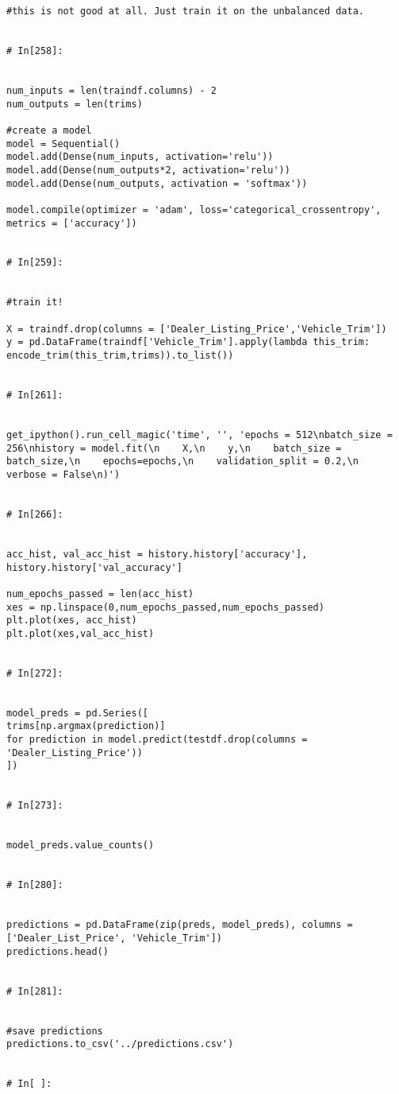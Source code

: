 \begin{verbatim}
#this is not good at all. Just train it on the unbalanced data.


# In[258]:


num_inputs = len(traindf.columns) - 2
num_outputs = len(trims)

#create a model
model = Sequential()
model.add(Dense(num_inputs, activation='relu'))
model.add(Dense(num_outputs*2, activation='relu'))
model.add(Dense(num_outputs, activation = 'softmax'))

model.compile(optimizer = 'adam', loss='categorical_crossentropy', metrics = ['accuracy'])


# In[259]:


#train it!

X = traindf.drop(columns = ['Dealer_Listing_Price','Vehicle_Trim'])
y = pd.DataFrame(traindf['Vehicle_Trim'].apply(lambda this_trim: encode_trim(this_trim,trims)).to_list())


# In[261]:


get_ipython().run_cell_magic('time', '', 'epochs = 512\nbatch_size = 256\nhistory = model.fit(\n    X,\n    y,\n    batch_size = batch_size,\n    epochs=epochs,\n    validation_split = 0.2,\n    verbose = False\n)')


# In[266]:


acc_hist, val_acc_hist = history.history['accuracy'], history.history['val_accuracy']

num_epochs_passed = len(acc_hist)
xes = np.linspace(0,num_epochs_passed,num_epochs_passed)
plt.plot(xes, acc_hist)
plt.plot(xes,val_acc_hist)


# In[272]:


model_preds = pd.Series([
trims[np.argmax(prediction)]
for prediction in model.predict(testdf.drop(columns = 'Dealer_Listing_Price'))
])


# In[273]:


model_preds.value_counts()


# In[280]:


predictions = pd.DataFrame(zip(preds, model_preds), columns = ['Dealer_List_Price', 'Vehicle_Trim'])
predictions.head()


# In[281]:


#save predictions
predictions.to_csv('../predictions.csv')


# In[ ]:





\end{verbatim}